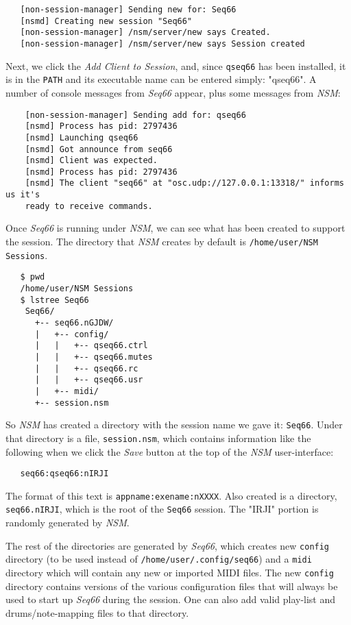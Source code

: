 \begin{verbatim}
   [non-session-manager] Sending new for: Seq66
   [nsmd] Creating new session "Seq66"
   [non-session-manager] /nsm/server/new says Created.
   [non-session-manager] /nsm/server/new says Session created
\end{verbatim}

   Next, we click the \textsl{Add Client to Session}, and, since
   \texttt{qseq66} has been installed, it is in the \texttt{PATH}
   and its executable name can be entered simply: "qseq66".
   A number of console messages from
   \textsl{Seq66} appear, plus some messages from \textsl{NSM}:

\begin{verbatim}
	[non-session-manager] Sending add for: qseq66
	[nsmd] Process has pid: 2797436
	[nsmd] Launching qseq66
	[nsmd] Got announce from seq66
	[nsmd] Client was expected.
	[nsmd] Process has pid: 2797436
	[nsmd] The client "seq66" at "osc.udp://127.0.0.1:13318/" informs us it's
    ready to receive commands.
\end{verbatim}

	Once \textsl{Seq66} is running under \textsl{NSM}, we can see what has
   been created to support the session.  The directory that \textsl{NSM}
   creates by default is \texttt{/home/user/NSM Sessions}.

\begin{verbatim}
   $ pwd
   /home/user/NSM Sessions
   $ lstree Seq66
	Seq66/
	  +-- seq66.nGJDW/
	  |   +-- config/
	  |   |   +-- qseq66.ctrl
	  |   |   +-- qseq66.mutes
	  |   |   +-- qseq66.rc
	  |   |   +-- qseq66.usr
	  |   +-- midi/
	  +-- session.nsm
\end{verbatim}

	So \textsl{NSM} has created a directory with the session name we gave it:
   \texttt{Seq66}.  Under that directory is a file, \texttt{session.nsm}, which
   contains information like the following when we click the \textsl{Save}
   button at the top of the \textsl{NSM} user-interface:

\begin{verbatim}
   seq66:qseq66:nIRJI
\end{verbatim}

   The format of this text is \texttt{appname:exename:nXXXX}.
   Also created is a directory, \texttt{seq66.nIRJI}, which is the root of the
   \texttt{Seq66} session.  The "IRJI" portion is randomly generated by
   \textsl{NSM}.

   The rest of the directories are generated by \textsl{Seq66}, which creates
   new \texttt{config} directory (to be used instead of
   \texttt{/home/user/.config/seq66}) and a \texttt{midi} directory which will
   contain any new or imported MIDI files.  The new \texttt{config} directory
   contains versions of the various configuration files that will always be
   used to start up \textsl{Seq66} during the session.  One can also add valid
   play-list and drums/note-mapping files to that directory.


